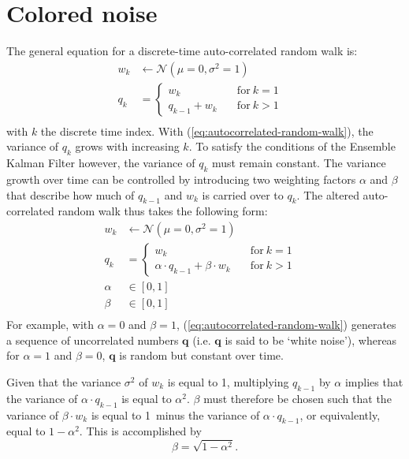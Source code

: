 
\chapter{Colored noise}
\label{ch:colored-noise-derivation}

The general equation for a discrete-time auto-correlated random walk is:
\begin{equation}
\label{eq:autocorrelated-random-walk}
\begin{align}
w_{k}&\leftarrow{}\mathcal{N}(\mu=0,\sigma^2=1) &\\
q_{k}&=\begin{cases}w_{k}&\quad{}\mathrm{for}\:k=1 \\
q_{k-1} + w_{k} &\quad{} \mathrm{for}\:k>1
\end{cases}\\
\end{align}
\end{equation}
with $k$ the discrete time index. With (\ref{eq:autocorrelated-random-walk}), the variance of $q_{k}$ grows with increasing $k$. To satisfy the conditions of the Ensemble Kalman Filter however, the variance of $q_{k}$ must remain constant. The variance growth over time can be controlled by introducing two weighting factors $\alpha$ and $\beta$ that describe how much of $q_{k-1}$ and $w_{k}$ is carried over to $q_{k}$. The altered auto-correlated random walk thus takes the following form:
\begin{equation}
\label{eq:autocorrelated-random-walk-weights}
\begin{align}
w_{k}&\leftarrow{}\mathcal{N}(\mu=0,\sigma^2=1) &\\
q_{k}&=\begin{cases}w_{k}&\quad{}\mathrm{for}\:k=1 \\
\alpha{}\cdot{}q_{k-1} + \beta\cdot{}w_{k} &\quad{} \mathrm{for}\:k>1
\end{cases}\\
\alpha&\in[0,1]&\\
\beta&\in[0,1]&\\
\end{align}
\end{equation}
For example, with $\alpha{}=0$ and $\beta=1$, (\ref{eq:autocorrelated-random-walk}) generates a sequence of uncorrelated numbers $\mathbf{q}$ (i.e. $\mathbf{q}$ is said to be `white noise'), whereas for $\alpha=1$ and $\beta=0$, $\mathbf{q}$ is random but constant over time.

Given that the variance $\sigma^2$ of $w_{k}$ is equal to 1, multiplying $q_{k-1}$ by $\alpha$ implies that the variance of $\alpha\cdot{}q_{k-1}$ is equal to $\alpha^2$.  $\beta$ must therefore be chosen such that the variance of $\beta\cdot{}w_k$ is equal to 1~minus the variance of $\alpha\cdot{}q_{k-1}$, or equivalently, equal to $1-\alpha^2$. This is accomplished by
\begin{equation}
\label{eq:beta-constant-variance}
\beta = \sqrt{1-\alpha^2}.
\end{equation}


